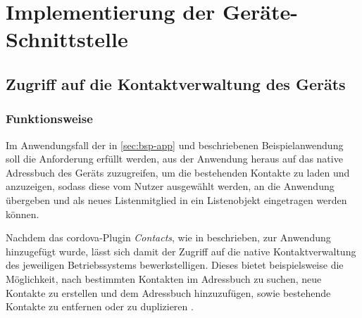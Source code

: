 \chapter{Implementierung der Geräte-Schnittstelle}	\label{sec:impl}	%





		
\section{Zugriff auf die Kontaktverwaltung des Geräts} \label{sec:contacts}

\subsection{Funktionsweise}

Im Anwendungsfall  der in \autoref{sec:bsp-app} und  beschriebenen Beispielanwendung soll die Anforderung erfüllt werden, aus der Anwendung heraus auf das native Adressbuch des Geräts zuzugreifen, um die bestehenden Kontakte zu laden und anzuzeigen, sodass diese vom Nutzer ausgewählt werden, an die Anwendung übergeben und als neues Listenmitglied in ein Listenobjekt eingetragen werden können.

Nachdem das \gls{cordova}-Plugin \emph{Contacts}, wie in  beschrieben, zur Anwendung hinzugefügt wurde, lässt sich damit der Zugriff auf die native Kontaktverwaltung des jeweiligen Betriebssystems bewerkstelligen.
Dieses bietet beispielsweise die Möglichkeit, nach bestimmten Kontakten im Adressbuch zu suchen, neue Kontakte zu erstellen und dem Adressbuch hinzuzufügen, sowie bestehende Kontakte zu entfernen oder zu duplizieren \cite{Cordova_Plugin_Registry_Contacts}.

